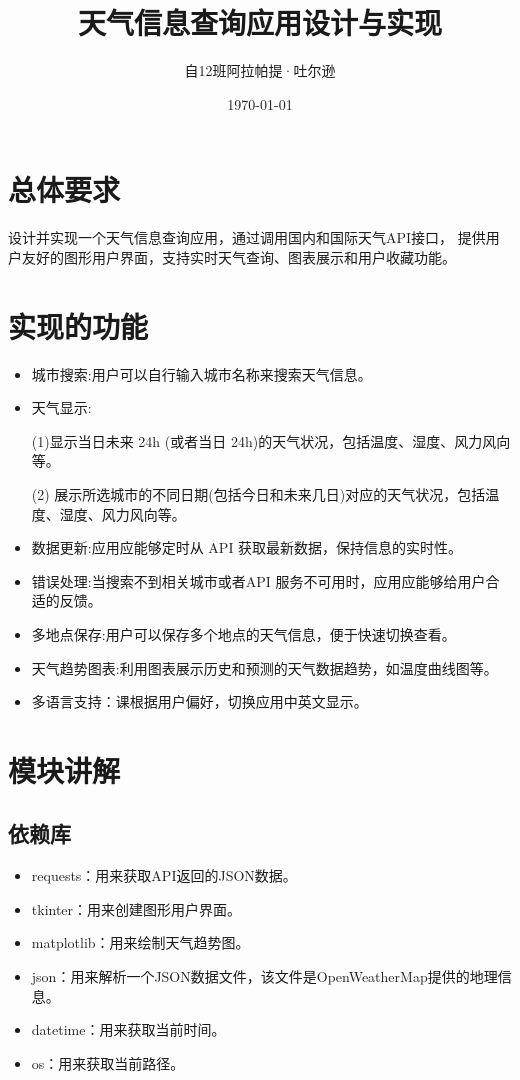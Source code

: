 \documentclass[UTF8]{ctexart}
\title{天气信息查询应用设计与实现}
\author{自12班\quad 阿拉帕提·吐尔逊\quad 2019010363}
\date{\today}
\begin{document}
\maketitle
\lstset{language=python}
\section{总体要求}

设计并实现一个天气信息查询应用，通过调用国内和国际天气API接口，
提供用户友好的图形用户界面，支持实时天气查询、图表展示和用户收藏功能。

\section{实现的功能}
\begin{itemize}
   \item 城市搜索:用户可以自行输入城市名称来搜索天气信息。
   \item 天气显示:
   
       (1)显示当日未来 24h (或者当日 24h)的天气状况，包括温度、湿度、风力风向等。
       
       (2) 展示所选城市的不同日期(包括今日和未来几日)对应的天气状况，包括温度、湿度、风力风向等。
   \item 数据更新:应用应能够定时从 API 获取最新数据，保持信息的实时性。
   \item 错误处理:当搜索不到相关城市或者API 服务不可用时，应用应能够给用户合适的反馈。
   \item 多地点保存:用户可以保存多个地点的天气信息，便于快速切换查看。
   \item 天气趋势图表:利用图表展示历史和预测的天气数据趋势，如温度曲线图等。
   \item 多语言支持：课根据用户偏好，切换应用中英文显示。
\end{itemize}

\section{模块讲解}
\subsection{依赖库}
\begin{itemize}
   \item requests：用来获取API返回的JSON数据。
   \item tkinter：用来创建图形用户界面。
   \item matplotlib：用来绘制天气趋势图。
   \item json：用来解析一个JSON数据文件，该文件是OpenWeatherMap提供的地理信息。
   \item datetime：用来获取当前时间。
   \item os：用来获取当前路径。
\end{itemize}
\end{document}
